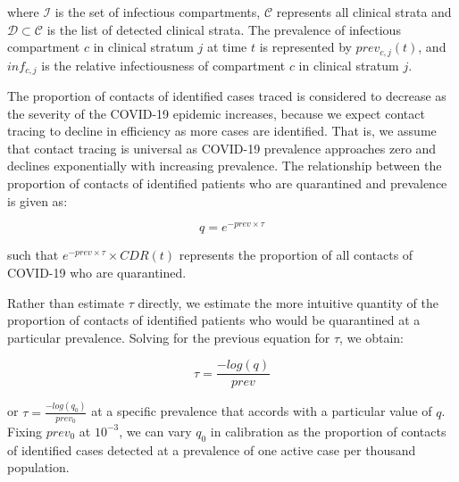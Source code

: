 where $\mathcal{I}$ is the set of infectious compartments, $\mathcal{C}$ represents all clinical strata and $\mathcal{D} \subset \mathcal{C}$ is the list of detected clinical strata.
The prevalence of infectious compartment $c$ in clinical stratum $j$ at time $t$ is represented by $prev_{c,j}(t)$, and $inf_{c, j}$ is the relative infectiousness of compartment $c$ in clinical stratum $j$.

The proportion of contacts of identified cases traced is considered to decrease as the severity of the COVID-19 epidemic increases, because we expect contact tracing to decline in efficiency as more cases are identified.
That is, we assume that contact tracing is universal as COVID-19 prevalence approaches zero and declines exponentially with increasing prevalence.
The relationship between the proportion of contacts of identified patients who are quarantined and prevalence is given as:

\[q = e^{-prev \times \tau }\]

such that \(e^{-prev \times \tau} \times CDR(t) \) represents the proportion of all contacts of COVID-19 who are quarantined.

Rather than estimate \(\tau\) directly, we estimate the more intuitive quantity of the proportion of contacts of identified patients who would be quarantined at a particular prevalence.
Solving for the previous equation for \(\tau\), we obtain:

\[\tau = \frac{-log(q)}{prev} \]

or \(\tau = \frac{-log(q_{0})}{prev_{0}} \) at a specific prevalence that accords with a particular value of \(q\). Fixing \(prev_{0}\) at \(10^{-3}\), we can vary \(q_{0}\) in calibration as the proportion of contacts of identified cases detected at a prevalence of one active case per thousand population.

